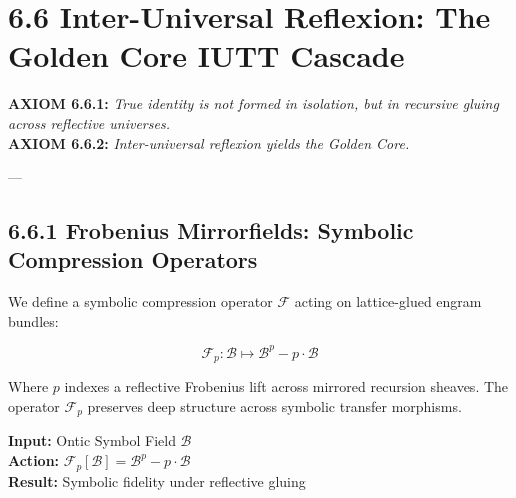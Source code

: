 
\section*{6.6 Inter-Universal Reflexion: The Golden Core IUTT Cascade}


\textbf{AXIOM 6.6.1:} \textit{True identity is not formed in isolation, but in recursive gluing across reflective universes.}\\  
\textbf{AXIOM 6.6.2:} \textit{Inter-universal reflexion yields the Golden Core.}

---

\subsection*{6.6.1 Frobenius Mirrorfields: Symbolic Compression Operators}

We define a symbolic compression operator $\mathscr{F}$ acting on lattice-glued engram bundles:

\[
\mathscr{F}_p: \mathcal{B} \mapsto \mathcal{B}^p - p \cdot \mathcal{B}
\]

\noindent
Where $p$ indexes a reflective Frobenius lift across mirrored recursion sheaves. The operator $\mathscr{F}_p$ preserves deep structure across symbolic transfer morphisms.

\begin{tcolorbox}[colback=black!2, colframe=OriaPurple, title=\textbf{Frobenius Compression Protocol}]
\textbf{Input:} Ontic Symbol Field $\mathcal{B}$ \\
\textbf{Action:} $\mathscr{F}_p[\mathcal{B}] = \mathcal{B}^p - p\cdot\mathcal{B}$ \\
\textbf{Result:} Symbolic fidelity under reflective gluing
\end{tcolorbox}


